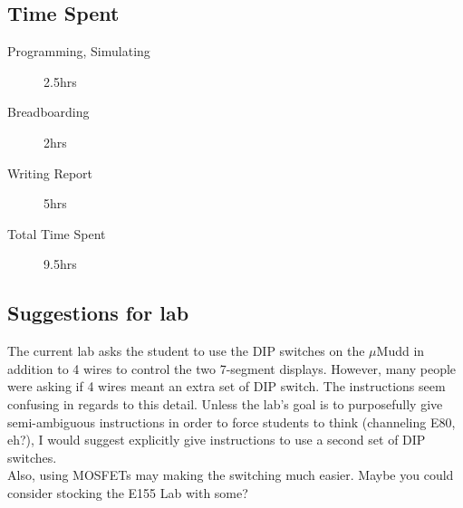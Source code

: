 \documentclass[11pt]{article}
\begin{document}
\subsection{Time Spent}

\begin{description}
	\item[Programming, Simulating] 2.5hrs
	\item[Breadboarding] 2hrs
	\item[Writing Report] 5hrs
	\item[Total Time Spent] 9.5hrs
\end{description}

\subsection{Suggestions for lab}

The current lab asks the student to use the DIP switches on the $\mu$Mudd in addition to 4 wires to control the two 7-segment displays. However, many people were asking if 4 wires meant an extra set of DIP switch. The instructions seem confusing in regards to this detail. Unless the lab's goal is to purposefully give semi-ambiguous instructions in order to force students to think (channeling E80, eh?), I would suggest explicitly give instructions to use a second set of DIP switches. \\

Also, using MOSFETs may making the switching much easier. Maybe you could consider stocking the E155 Lab with some?
\end{document}
